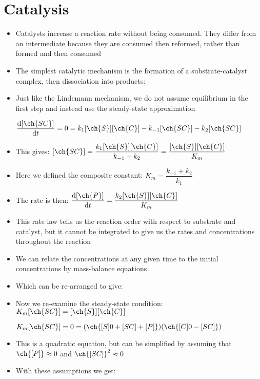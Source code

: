 \documentclass[12pt, openany, letterpaper]{memoir}
\begin{document}
\section*{Catalysis}
\begin{itemize}
	\item Catalysts increase a reaction rate without being consumed. They differ from an intermediate because they are consumed then reformed, rather than formed and then consumed
	\item The simplest catalytic mechanism is the formation of a substrate-catalyst complex, then dissociation into products:
	
	
	\item Just like the Lindemann mechanism, we do not assume equilibrium in the first step and instead use the steady-state approximation
	
	$\dfrac{\mathrm{d}[\ch{SC}]}{\mathrm{d}t}=0=k_1[\ch{S}][\ch{C}] - k_{-1}[\ch{SC}] - k_2[\ch{SC}]$
	\item This gives: $[\ch{SC}] = \dfrac{k_1[\ch{S}][\ch{C}]}{k_{-1}+k_2} = \dfrac{[\ch{S}][\ch{C}]}{K_m}$
	\item Here we defined the composite constant: $K_m = \dfrac{k_{-1}+k_2}{k_1}$	
	\item The rate is then: $\dfrac{\mathrm{d}[\ch{P}]}{\mathrm{d}t} = \dfrac{k_2[\ch{S}][\ch{C}]}{K_m}$
	\item This rate law tells us the reaction order with respect to substrate and catalyst, but it cannot be integrated to give us the rates and concentrations throughout the reaction
	\item We can relate the concentrations at any given time to the initial concentrations by mass-balance equations
	
	
	\item Which can be re-arranged to give:
	
	
	\item Now we re-examine the steady-state condition: $K_m[\ch{SC}] = [\ch{S}][\ch{C}]$
	
	$K_m[\ch{SC}] = 0 = (\ch{[S]0 + [SC] + [P]})(\ch{[C]0 - [SC]})$
	\item This is a quadratic equation, but can be simplified by assuming that $\ch{[P]}\approx 0$ and $\ch{[SC]}^2\approx 0$
	\item With these assumptions we get:
	

\end{itemize}
\end{document}

